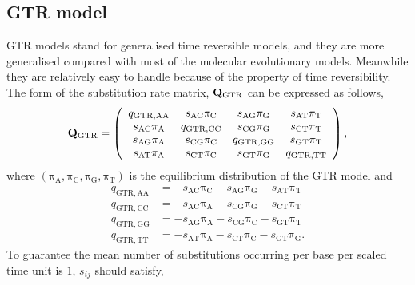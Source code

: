 \documentclass{article}
\begin{document}
\subsection{GTR model}\label{subsec:MLGTR}
GTR models stand for generalised time reversible models, and they are more generalised compared with most of the molecular evolutionary models. Meanwhile they are relatively easy to handle because of the property of time reversibility. The form of the substitution rate matrix, ${\bf Q}_{\mathrm{GTR}}$ can be expressed as follows,
\begin{align*}
{\bf Q}_{\mathrm{GTR}}=\left(\begin{array}{cccc}
    q_{\mathrm{GTR,AA}} & s_{\mathrm{AC}}\mathrm{\pi}_{\mathrm{C}} & s_{\mathrm{AG}}\mathrm{\pi}_{\mathrm{G}} & s_{\mathrm{AT}}\mathrm{\pi}_{\mathrm{T}}\\
     s_{\mathrm{AC}}\mathrm{\pi}_{\mathrm{A}} & q_{\mathrm{GTR,CC}} & s_{\mathrm{CG}}\mathrm{\pi}_{\mathrm{G}} & s_{\mathrm{CT}}\mathrm{\pi}_{\mathrm{T}} \\
     s_{\mathrm{AG}}\mathrm{\pi}_{\mathrm{A}} & s_{\mathrm{CG}}\mathrm{\pi}_{\mathrm{C}} &  q_{\mathrm{GTR,GG}} & s_{\mathrm{GT}}\mathrm{\pi}_{\mathrm{T}} \\
     s_{\mathrm{AT}}\mathrm{\pi}_{\mathrm{A}} & s_{\mathrm{CT}}\mathrm{\pi}_{\mathrm{C}} & s_{\mathrm{GT}}\mathrm{\pi}_{\mathrm{G}} & q_{\mathrm{GTR,TT}}
\end{array}\right),
\end{align*}
where $\left(\mathrm{\pi}_{\mathrm{A}},\mathrm{\pi}_{\mathrm{C}},\mathrm{\pi}_{\mathrm{G}},\mathrm{\pi}_{\mathrm{T}}\right)$ is the equilibrium distribution of the GTR model and
\begin{align*}
    q_{\mathrm{GTR,AA}}&=-s_{\mathrm{AC}}\mathrm{\pi}_{\mathrm{C}}-s_{\mathrm{AG}}\mathrm{\pi}_{\mathrm{G}}-s_{\mathrm{AT}}\mathrm{\pi}_{\mathrm{T}} \\
    q_{\mathrm{GTR,CC}}&=-s_{\mathrm{AC}}\mathrm{\pi}_{\mathrm{A}}-s_{\mathrm{CG}}\mathrm{\pi}_{\mathrm{G}}-s_{\mathrm{CT}}\mathrm{\pi}_{\mathrm{T}} \\
    q_{\mathrm{GTR,GG}}&=-s_{\mathrm{AG}}\mathrm{\pi}_{\mathrm{A}}-s_{\mathrm{CG}}\mathrm{\pi}_{\mathrm{C}}-s_{\mathrm{GT}}\mathrm{\pi}_{\mathrm{T}} \\
    q_{\mathrm{GTR,TT}}&=-s_{\mathrm{AT}}\mathrm{\pi}_{\mathrm{A}}-s_{\mathrm{CT}}\mathrm{\pi}_{\mathrm{C}}-s_{\mathrm{GT}}\mathrm{\pi}_{\mathrm{G}}.
\end{align*}
To guarantee the mean number of substitutions occurring per base per scaled time unit is $1$, $s_{ij}$ should satisfy,
\end{document}
